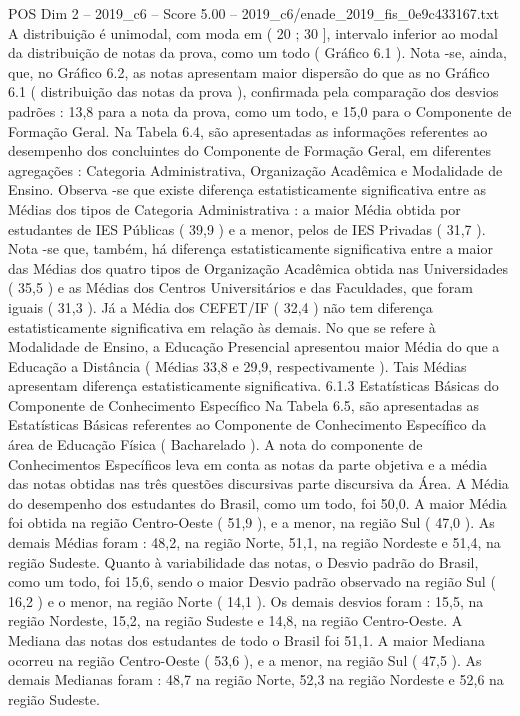 \begin{textsample}{POS Dim 2 – 2019\_c6 – Score 5.00 – 2019\_c6/enade\_2019\_fis\_0e9c433167.txt}
A distribuição é unimodal, com moda em ( 20 ; 30 ], intervalo inferior ao modal da distribuição de notas da prova, como um todo ( Gráfico 6.1 ).
Nota -se, ainda, que, no Gráfico 6.2, as notas apresentam maior dispersão do que as no Gráfico 6.1 ( distribuição das notas da prova ), confirmada pela comparação dos desvios padrões : 13,8 para a nota da prova, como um todo, e 15,0 para o Componente de Formação Geral.
Na Tabela 6.4, são apresentadas as informações referentes ao desempenho dos concluintes do Componente de Formação Geral, em diferentes agregações : Categoria Administrativa, Organização Acadêmica e Modalidade de Ensino.
Observa -se que existe diferença estatisticamente significativa entre as Médias dos tipos de Categoria Administrativa : a maior Média obtida por estudantes de IES Públicas ( 39,9 ) e a menor, pelos de IES Privadas ( 31,7 ).
Nota -se que, também, há diferença estatisticamente significativa entre a maior das Médias dos quatro tipos de Organização Acadêmica obtida nas Universidades ( 35,5 ) e as Médias dos Centros Universitários e das Faculdades, que foram iguais ( 31,3 ).
Já a Média dos CEFET/IF ( 32,4 ) não tem diferença estatisticamente significativa em relação às demais.
No que se refere à Modalidade de Ensino, a Educação Presencial apresentou maior Média do que a Educação a Distância ( Médias 33,8 e 29,9, respectivamente ).
Tais Médias apresentam diferença estatisticamente significativa. 6.1.3 Estatísticas Básicas do Componente de Conhecimento Específico Na Tabela 6.5, são apresentadas as Estatísticas Básicas referentes ao Componente de Conhecimento Específico da área de Educação Física ( Bacharelado ).
A nota do componente de Conhecimentos Específicos leva em conta as notas da parte objetiva e a média das notas obtidas nas três questões discursivas parte discursiva da Área.
A Média do desempenho dos estudantes do Brasil, como um todo, foi 50,0.
A maior Média foi obtida na região Centro-Oeste ( 51,9 ), e a menor, na região Sul ( 47,0 ).
As demais Médias foram : 48,2, na região Norte, 51,1, na região Nordeste e 51,4, na região Sudeste.
Quanto à variabilidade das notas, o Desvio padrão do Brasil, como um todo, foi 15,6, sendo o maior Desvio padrão observado na região Sul ( 16,2 ) e o menor, na região Norte ( 14,1 ).
Os demais desvios foram : 15,5, na região Nordeste, 15,2, na região Sudeste e 14,8, na região Centro-Oeste.
A Mediana das notas dos estudantes de todo o Brasil foi 51,1.
A maior Mediana ocorreu na região Centro-Oeste ( 53,6 ), e a menor, na região Sul ( 47,5 ).
As demais Medianas foram : 48,7 na região Norte, 52,3 na região Nordeste e 52,6 na região Sudeste.

\end{textsample}
